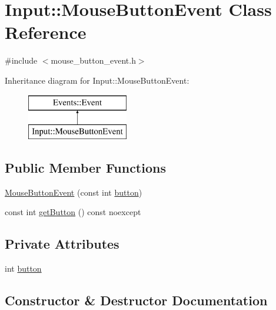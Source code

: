 \hypertarget{class_input_1_1_mouse_button_event}{}\section{Input\+:\+:Mouse\+Button\+Event Class Reference}
\label{class_input_1_1_mouse_button_event}


{\ttfamily \#include $<$mouse\+\_\+button\+\_\+event.\+h$>$}

Inheritance diagram for Input\+:\+:Mouse\+Button\+Event\+:\begin{figure}[H]
\begin{center}
\leavevmode
\includegraphics[height=2.000000cm]{class_input_1_1_mouse_button_event}
\end{center}
\end{figure}
\subsection*{Public Member Functions}
\begin{DoxyCompactItemize}
\item 
\hyperlink{class_input_1_1_mouse_button_event_ad53b26fb96fea26b8cc60e61c4298fd3}{Mouse\+Button\+Event} (const int \hyperlink{class_input_1_1_mouse_button_event_a94085b7e211bd8154dc4774b44786801}{button})
\item 
const int \hyperlink{class_input_1_1_mouse_button_event_a6723528770ad19668f97d2d4135d189e}{get\+Button} () const noexcept
\end{DoxyCompactItemize}
\subsection*{Private Attributes}
\begin{DoxyCompactItemize}
\item 
int \hyperlink{class_input_1_1_mouse_button_event_a94085b7e211bd8154dc4774b44786801}{button}
\end{DoxyCompactItemize}


\subsection{Constructor \& Destructor Documentation}
\hypertarget{class_input_1_1_mouse_button_event_ad53b26fb96fea26b8cc60e61c4298fd3}{}
